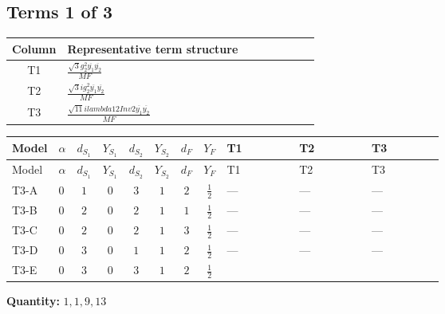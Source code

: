 \documentclass[8pt]{article}
\begin{document}
\begin{landscape}
\subsection*{Terms 1 of 3}
\begin{center}
\begin{tabular}{@{}c >{\raggedright\arraybackslash}p{0.82\linewidth}@{}}
\toprule
Column & Representative term structure \\
\midrule
T1 & \(\displaystyle \frac{\sqrt{3} g_{2}^{2} \overline{y_{1}} \overline{y_{2}}}{MF}\) \\
\midrule
T2 & \(\displaystyle \frac{\sqrt{3} i g_{2}^{2} \overline{y_{1}} \overline{y_{2}}}{MF}\) \\
\midrule
T3 & \(\displaystyle \frac{\sqrt{11} i lambda12Inv2 \overline{y_{1}} \overline{y_{2}}}{MF}\) \\
\midrule
\bottomrule
\end{tabular}
\end{center}
\smallskip
\tiny
\begin{longtable}{@{}llcccccc >{\raggedright\arraybackslash}p{0.21\linewidth} >{\raggedright\arraybackslash}p{0.21\linewidth} >{\raggedright\arraybackslash}p{0.21\linewidth}@{}}
\toprule
Model & $\alpha$ & $d_{S_1}$ & $Y_{S_1}$ & $d_{S_2}$ & $Y_{S_2}$ & $d_F$ & $Y_F$ & T1 & T2 & T3 \\
\midrule
\endfirsthead
\toprule
Model & $\alpha$ & $d_{S_1}$ & $Y_{S_1}$ & $d_{S_2}$ & $Y_{S_2}$ & $d_F$ & $Y_F$ & T1 & T2 & T3 \\
\midrule
\endhead
T3-A & $0$ & $1$ & $0$ & $3$ & $1$ & $2$ & $\frac{1}{2}$ & --- & --- & --- \\
\midrule
T3-B & $0$ & $2$ & $0$ & $2$ & $1$ & $1$ & $\frac{1}{2}$ & --- & --- & --- \\
\midrule
T3-C & $0$ & $2$ & $0$ & $2$ & $1$ & $3$ & $\frac{1}{2}$ & --- & --- & --- \\
\midrule
T3-D & $0$ & $3$ & $0$ & $1$ & $1$ & $2$ & $\frac{1}{2}$ & --- & --- & --- \\
\midrule
T3-E & $0$ & $3$ & $0$ & $3$ & $1$ & $2$ & $\frac{1}{2}$ & \scriptsize\adjustbox{max width=\linewidth}{$\begin{gathered} - \frac{\sqrt{3} g_{2}^{2} \overline{y_{1}} \overline{y_{2}}}{6 MF}\end{gathered}$} & \scriptsize\adjustbox{max width=\linewidth}{$\begin{gathered} - \frac{49 \sqrt{3} i g_{2}^{2} \overline{y_{1}} \overline{y_{2}}}{24 MF}\end{gathered}$} & \scriptsize\adjustbox{max width=\linewidth}{$\begin{gathered} - \frac{3 \sqrt{11} i lambda12Inv2 \overline{y_{1}} \overline{y_{2}}}{22 MF}\end{gathered}$} \\
\midrule
\bottomrule
\end{longtable}
\clearpage
\noindent\textbf{Quantity: }$\mathrm{1,1,9,13}$\par\smallskip

\end{landscape}
\end{document}

